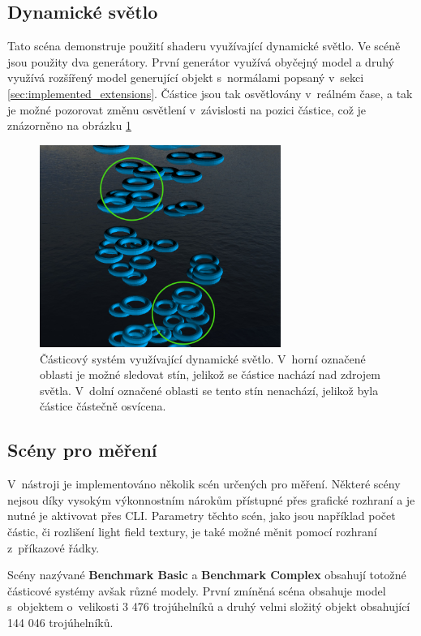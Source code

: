 \subsection*{Dynamické světlo}
\label{sec:real_light_scene}
Tato scéna demonstruje použití shaderu využívající dynamické světlo. Ve scéně jsou použity dva generátory. První generátor využívá obyčejný model a druhý využívá rozšířený model generující objekt s~normálami popsaný v~sekci \ref{sec:implemented_extensions}. Částice jsou tak osvětlovány v~reálném čase, a tak je možné pozorovat změnu osvětlení v~závislosti na pozici částice, což je znázorněno na obrázku \ref{fig:rel_light}
\begin{figure}[H]
	\centering
	\includegraphics[width=0.7\textwidth]{obrazky-figures/dynamic_light.png}
	\caption{Částicový systém využívající dynamické světlo. V~horní označené oblasti je možné sledovat stín, jelikož se částice nachází nad zdrojem světla. V~dolní označené oblasti se tento stín nenachází, jelikož byla částice částečně osvícena.}
	\label{fig:rel_light}
\end{figure}
\subsection*{Scény pro měření}
V~nástroji je implementováno několik scén určených pro měření. Některé scény nejsou díky vysokým výkonnostním nárokům přístupné přes grafické rozhraní a je nutné je aktivovat přes CLI. Parametry těchto scén, jako jsou například počet částic, či rozlišení light field textury, je také možné měnit pomocí rozhraní z~příkazové řádky. 

Scény nazývané \textbf{Benchmark Basic} a \textbf{Benchmark Complex} obsahují totožné částicové systémy avšak různé modely. První zmíněná scéna obsahuje model s~objektem o~velikosti 3 476 trojúhelníků a druhý velmi složitý objekt obsahující 144 046 trojúhelníků.

